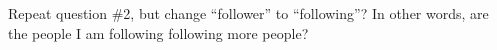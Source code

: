 Repeat question \#2, but change \enquote{follower} to \enquote{following}?  In
other words, are the people I am following following more people?